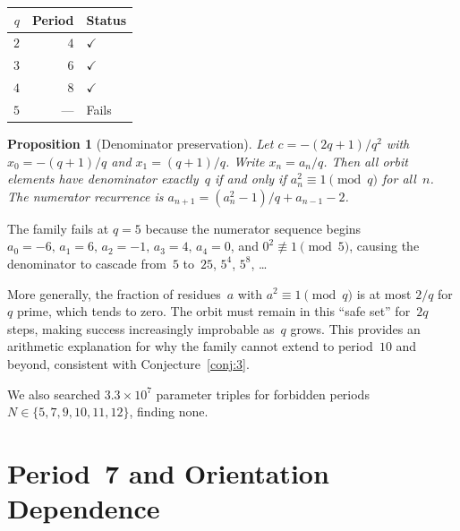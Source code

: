 \documentclass[11pt]{article}
\newtheorem{proposition}[theorem]{Proposition}
\theoremstyle{definition}
\theoremstyle{remark}
\begin{document}
\begin{center}
\begin{tabular}{@{} rrl @{}}
  \toprule
  $q$ & Period & Status \\
  \midrule
  $2$ & $4$ & $\checkmark$ \\
  $3$ & $6$ & $\checkmark$ \\
  $4$ & $8$ & $\checkmark$ \\
  $5$ & --- & Fails \\
  \bottomrule
\end{tabular}
\end{center}

\begin{proposition}[Denominator preservation]\label{prop:denom}
  Let $c = -(2q+1)/q^2$ with $x_0 = -(q+1)/q$ and $x_1 = (q+1)/q$.
  Write $x_n = a_n/q$.  Then all orbit elements have denominator exactly~$q$
  if and only if $a_n^2 \equiv 1 \pmod{q}$ for all~$n$.
  The numerator recurrence is
  $a_{n+1} = (a_n^2 - 1)/q + a_{n-1} - 2$.
\end{proposition}

The family fails at $q = 5$ because the numerator sequence begins
$a_0 = -6,\, a_1 = 6,\, a_2 = -1,\, a_3 = 4,\, a_4 = 0$,
and $0^2 \not\equiv 1 \pmod{5}$, causing the denominator to cascade from~$5$
to~$25$, $5^4$, $5^8$, \ldots

More generally, the fraction of residues~$a$ with $a^2 \equiv 1 \pmod{q}$
is at most $2/q$ for $q$ prime, which tends to zero.  The orbit must remain
in this ``safe set'' for~$2q$ steps, making success increasingly improbable
as~$q$ grows.  This provides an arithmetic explanation for why the family
cannot extend to period~$10$ and beyond, consistent with Conjecture~\ref{conj:3}.

We also searched $3.3 \times 10^7$ parameter triples for forbidden periods
$N \in \{5, 7, 9, 10, 11, 12\}$, finding none.


\section{Period~7 and Orientation Dependence}
\label{sec:period7}
\end{document}
